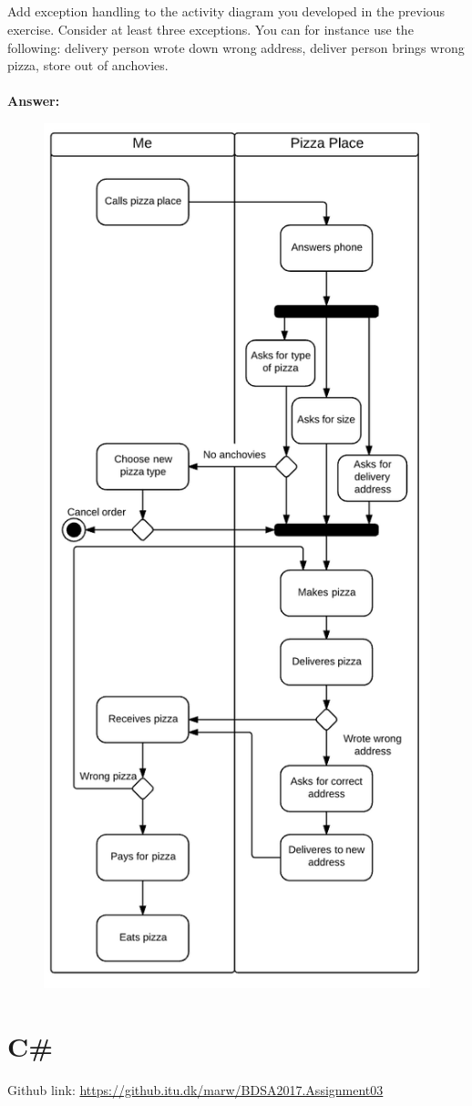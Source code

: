 \documentclass[a4paper]{article}
\begin{document}
\subsection{}
Add exception handling to the activity diagram you developed in the previous exercise. Consider at least three exceptions. You can for instance use the following: delivery person wrote down wrong address, deliver person brings wrong pizza, store out of anchovies.\\
\\
\textbf{Answer:} 
\begin{figure}[H]
\includegraphics[]{ActivityWE}
\centering
\end{figure}

\section{C\#}
Github link: \url{https://github.itu.dk/marw/BDSA2017.Assignment03}
\end{document}
